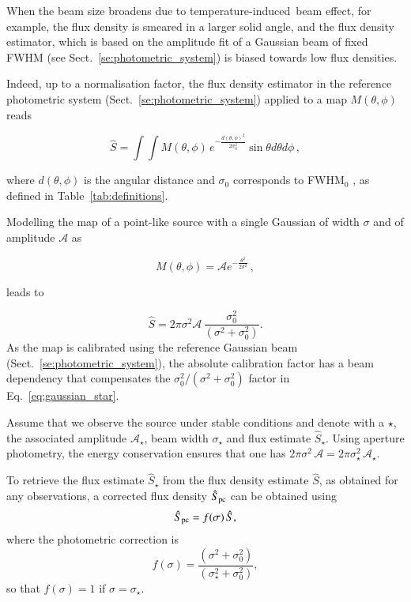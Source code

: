 \documentclass[traditionalabstract]{aa}
\newcommand{\afternoon}{temperature-induced}
\begin{document}
{\begin{appendix}
When the beam size broadens due to \afternoon\ beam effect, for example, the flux
density is smeared in a larger solid angle, and the flux density estimator, which
is based on the amplitude fit of a Gaussian beam of fixed FWHM (see
Sect.~\ref{se:photometric_system}) is biased towards low flux
densities.

Indeed, up to a normalisation factor, the flux density
estimator in the reference photometric system (Sect.~\ref{se:photometric_system}) applied to a map
$M(\theta,\phi)$ reads

\begin{equation}
  \hat{S}  = \int \int M(\theta, \phi)\, e^{-\frac{d(\theta,\phi)^{2}}{2\sigma_{0}^{2}}} \sin \theta d\theta d\phi\,,
  \label{eq:flux_density_estimator}
\end{equation}

where $d(\theta,\phi)$ is the angular distance and $\sigma_0$
corresponds to FWHM$_0$
, as defined in Table~\ref{tab:definitions}.

Modelling the map of a point-like source with a single Gaussian of
width $\sigma$ and of amplitude $\mathcal{A}$ as

\begin{equation}
  M(\theta, \phi) = \mathcal{A} e^{-\frac{\theta^{2}}{2\sigma^2}}\,,
  \label{eq:pointsource_map}
\end{equation}

leads to

\begin{equation}
  \hat{S}  = 2\pi \sigma^2 \mathcal{A} \,  \frac{\sigma_0^2}{(\sigma^2 + \sigma_0^2)}.
  \label{eq:gaussian_star}
\end{equation}
As the map is calibrated using the reference Gaussian beam
(Sect.~\ref{se:photometric_system}), the absolute calibration factor %
has a beam dependency that compensates the
$\sigma_0^2/(\sigma^2 + \sigma_0^2)$ factor in Eq.~\ref{eq:gaussian_star}.

Assume that we observe the source under stable conditions and
denote with a $\star$, the associated amplitude $\mathcal{A}_\star$, beam width
$\sigma_\star$ and flux estimate $\hat{S}_\star$. Using aperture
photometry, the energy conservation ensures that one has
$2\pi\sigma^2 \, \mathcal{A} = 2\pi\sigma_\star^2 \, \mathcal{A_\star}$.

To retrieve the flux estimate $\hat{S}_\star$ from the flux density
estimate $\hat{S}$, as obtained for any observations, a
corrected flux density $\hat{S}_{\rm{pc}}$ can be obtained using 
\begin{equation}
  \hat{S}_{\rm{pc}} = f(\sigma) \, \hat{S},
\end{equation} 
where the photometric correction is 
\begin{equation}
  f(\sigma) = \frac{(\sigma^2 + \sigma_0^2)}{(\sigma_\star^2+\sigma_0^2)}, 
\end{equation} 
so that $f(\sigma) = 1$ if $\sigma=\sigma_\star$.


\end{appendix}}
\end{document}
